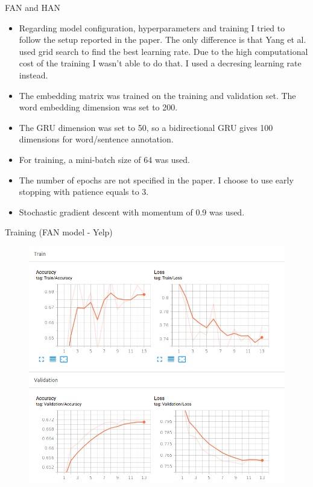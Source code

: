 \documentclass[10pt]{beamer}
\begin{document}
\begin{frame}{FAN and HAN}
\small{
\begin{itemize}
\item
Regarding model configuration, hyperparameters and training I tried to follow the setup reported in the paper. The only difference is that Yang et al. \cite{yang2016hierarchical} used grid search to find the best learning rate. Due to the high computational cost of the training I wasn't able to do that. I used a decresing learning rate instead.
\item
The embedding matrix was trained on the training and validation set. The word embedding dimension was set to 200.
\item
The GRU dimension was set to 50, so a bidirectional GRU gives 100 dimensions for word/sentence annotation.
\item
For training, a mini-batch size of 64 was used.
\item
The number of epochs are not specified in the paper. I choose to use early stopping with patience equals to 3.
\item
Stochastic gradient descent with momentum of 0.9 was used.
\end{itemize}
}
\end{frame}



\begin{frame}{Training (FAN model - Yelp)}

\begin{figure}[H]
\centering
\includegraphics[scale=0.3]{img/yelp-fan.png}
\end{figure}

\end{frame}
\end{document}
